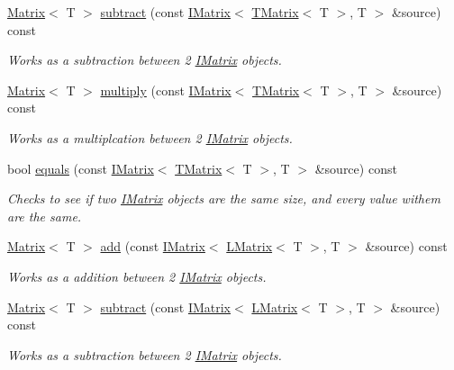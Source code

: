 \begin{DoxyCompactItemize}
\mbox{\hyperlink{class_matrix}{Matrix}}$<$ T $>$ \mbox{\hyperlink{class_u_matrix_a0de257500dfff1846e46b226af2292d2}{subtract}} (const \mbox{\hyperlink{class_i_matrix}{I\+Matrix}}$<$ \mbox{\hyperlink{class_t_matrix}{T\+Matrix}}$<$ T $>$, T $>$ \&source) const
\begin{DoxyCompactList}\small\item\em Works as a subtraction between 2 \mbox{\hyperlink{class_i_matrix}{I\+Matrix}} objects. \end{DoxyCompactList}\item 
\mbox{\hyperlink{class_matrix}{Matrix}}$<$ T $>$ \mbox{\hyperlink{class_u_matrix_af2287fc1f226471b98347ad92c4ebf63}{multiply}} (const \mbox{\hyperlink{class_i_matrix}{I\+Matrix}}$<$ \mbox{\hyperlink{class_t_matrix}{T\+Matrix}}$<$ T $>$, T $>$ \&source) const
\begin{DoxyCompactList}\small\item\em Works as a multiplcation between 2 \mbox{\hyperlink{class_i_matrix}{I\+Matrix}} objects. \end{DoxyCompactList}\item 
bool \mbox{\hyperlink{class_u_matrix_a12dfc33238c78fafac50c6da51e5563a}{equals}} (const \mbox{\hyperlink{class_i_matrix}{I\+Matrix}}$<$ \mbox{\hyperlink{class_t_matrix}{T\+Matrix}}$<$ T $>$, T $>$ \&source) const
\begin{DoxyCompactList}\small\item\em Checks to see if two \mbox{\hyperlink{class_i_matrix}{I\+Matrix}} objects are the same size, and every value withem are the same. \end{DoxyCompactList}\item 
\mbox{\hyperlink{class_matrix}{Matrix}}$<$ T $>$ \mbox{\hyperlink{class_u_matrix_a61e915c511ccc6f751b65812b4edda68}{add}} (const \mbox{\hyperlink{class_i_matrix}{I\+Matrix}}$<$ \mbox{\hyperlink{class_l_matrix}{L\+Matrix}}$<$ T $>$, T $>$ \&source) const
\begin{DoxyCompactList}\small\item\em Works as a addition between 2 \mbox{\hyperlink{class_i_matrix}{I\+Matrix}} objects. \end{DoxyCompactList}\item 
\mbox{\hyperlink{class_matrix}{Matrix}}$<$ T $>$ \mbox{\hyperlink{class_u_matrix_a91d154dcb9e91cd53dbf3c6ebbc40d20}{subtract}} (const \mbox{\hyperlink{class_i_matrix}{I\+Matrix}}$<$ \mbox{\hyperlink{class_l_matrix}{L\+Matrix}}$<$ T $>$, T $>$ \&source) const
\begin{DoxyCompactList}\small\item\em Works as a subtraction between 2 \mbox{\hyperlink{class_i_matrix}{I\+Matrix}} objects. \end{DoxyCompactList}\item 

\end{DoxyCompactItemize}
